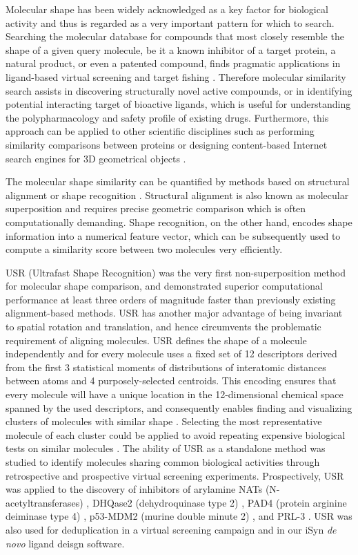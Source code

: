 Molecular shape has been widely acknowledged as a key factor for biological activity and thus is regarded as a very important pattern for which to search. Searching the molecular database for compounds that most closely resemble the shape of a given query molecule, be it a known inhibitor of a target protein, a natural product, or even a patented compound, finds pragmatic applications in ligand-based virtual screening \citep{1332,1380,1281,1504,1502} and target fishing \citep{1528,1407,1408,1402}. Therefore molecular similarity search assists in discovering structurally novel active compounds, or in identifying potential interacting target of bioactive ligands, which is useful for understanding the polypharmacology and safety profile of existing drugs. Furthermore, this approach can be applied to other scientific disciplines such as performing similarity comparisons between proteins or designing content-based Internet search engines for 3D geometrical objects \citep{1280}.

The molecular shape similarity can be quantified by methods based on structural alignment \citep{1440,887,1439,1534} or shape recognition \citep{1379,1338,1331}. Structural alignment is also known as molecular superposition and requires precise geometric comparison which is often computationally demanding. Shape recognition, on the other hand, encodes shape information into a numerical feature vector, which can be subsequently used to compute a similarity score between two molecules very efficiently.

USR (Ultrafast Shape Recognition) \citep{1379} was the very first non-superposition method for molecular shape comparison, and demonstrated superior computational performance at least three orders of magnitude faster than previously existing alignment-based methods. USR has another major advantage of being invariant to spatial rotation and translation, and hence circumvents the problematic requirement of aligning molecules. USR defines the shape of a molecule independently and for every molecule uses a fixed set of 12 descriptors derived from the first 3 statistical moments of distributions of interatomic distances between atoms and 4 purposely-selected centroids. This encoding ensures that every molecule will have a unique location in the 12-dimensional chemical space spanned by the used descriptors, and consequently enables finding and visualizing clusters of molecules with similar shape \citep{1280,1332}. Selecting the most representative molecule of each cluster could be applied to avoid repeating expensive biological tests on similar molecules \citep{1280}. The ability of USR as a standalone method was studied to identify molecules sharing common biological activities through retrospective \citep{1332} and prospective \citep{1380,1281,1504,1502,1615} virtual screening experiments. Prospectively, USR was applied to the discovery of inhibitors of arylamine NATs (N-acetyltransferases) \citep{1380}, DHQase2 (dehydroquinase type 2) \citep{1281}, PAD4 (protein arginine deiminase type 4) \citep{1504}, p53-MDM2 (murine double minute 2) \citep{1502}, and PRL-3 \citep{1615}. USR was also used for deduplication in a virtual screening campaign \citep{1390} and in our iSyn \citep{1409,1387} \textit{de novo} ligand deisgn software.


